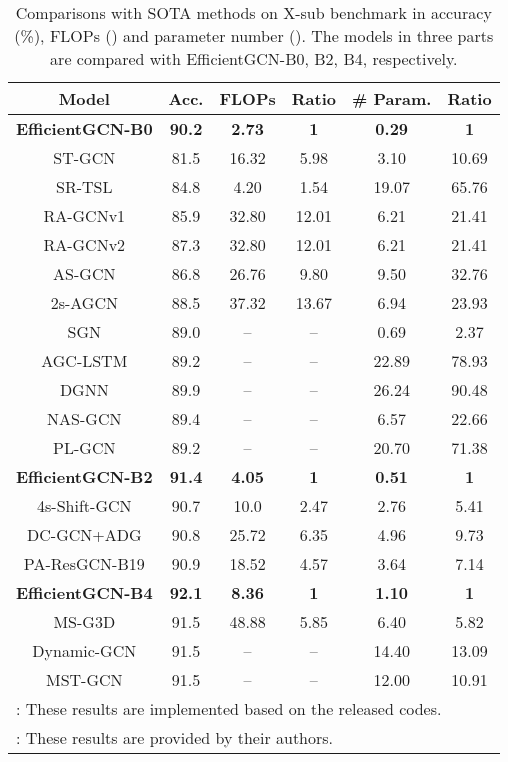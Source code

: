 \documentclass[10pt,journal,compsoc]{IEEEtran}
\begin{document}
\begin{table}[t]
  \caption{Comparisons with SOTA methods on X-sub benchmark in accuracy (\%), FLOPs () and parameter number (). The models in three parts are compared with EfficientGCN-B0, B2, B4, respectively.}
  \label{tab:complexity}
  \vspace{-0.4cm}
  \centering
  \setlength{\tabcolsep}{4pt}
  \renewcommand{\arraystretch}{1.2}
  \begin{tabular}{cc|cc|cc}
  \toprule
  Model & Acc. & FLOPs & Ratio & \# Param. & Ratio \\
  \midrule
  {\bf EfficientGCN-B0} & {\bf 90.2} & {\bf 2.73} & {\bf 1} & {\bf 0.29} & {\bf 1} \\
  ST-GCN \cite{yan2018spatial} & 81.5 & 16.32 & 5.98 & 3.10 & 10.69 \\
  SR-TSL \cite{si2018skeleton} & 84.8 & 4.20 & 1.54 & 19.07 & 65.76 \\
  RA-GCNv1 \cite{song2019richly} & 85.9 & 32.80 & 12.01 & 6.21 & 21.41 \\
  RA-GCNv2 \cite{song2020richly} & 87.3 & 32.80 & 12.01 & 6.21 & 21.41 \\
  AS-GCN \cite{li2019actional} & 86.8 & 26.76 & 9.80 & 9.50 & 32.76 \\
  2s-AGCN \cite{shi2019two} & 88.5 & 37.32 & 13.67 & 6.94 & 23.93 \\
  SGN \cite{zhang2020semantics} & 89.0 & -- & -- & 0.69 & 2.37 \\
  AGC-LSTM \cite{si2019attention} & 89.2 & -- & -- & 22.89 & 78.93 \\
  DGNN \cite{shi2019skeleton} & 89.9 & -- & -- & 26.24 & 90.48 \\
  NAS-GCN \cite{peng2020learning} & 89.4 & -- & -- & 6.57 & 22.66 \\
  PL-GCN \cite{huang2020part} & 89.2 & -- & -- & 20.70 & 71.38 \\
  \midrule
  {\bf EfficientGCN-B2} & {\bf 91.4} & {\bf 4.05} & {\bf 1} & {\bf 0.51} & {\bf 1} \\
  4s-Shift-GCN \cite{cheng2020skeleton} & 90.7 & 10.0 & 2.47 & 2.76 & 5.41 \\
  DC-GCN+ADG \cite{cheng2020decoupling} & 90.8 & 25.72 & 6.35 & 4.96 & 9.73 \\
  PA-ResGCN-B19 \cite{song2020stronger} & 90.9 & 18.52 & 4.57 & 3.64 & 7.14 \\
  \midrule
  {\bf EfficientGCN-B4} & {\bf 92.1} & {\bf 8.36} & {\bf 1} & {\bf 1.10} & {\bf 1} \\
  MS-G3D \cite{liu2020disentangling} & 91.5 & 48.88 & 5.85 & 6.40 & 5.82 \\
  Dynamic-GCN \cite{ye2020dynamic} & 91.5 & -- & -- & 14.40 & 13.09 \\
  MST-GCN \cite{chen2021multi} & 91.5 & -- & -- & 12.00 & 10.91 \\
  \bottomrule
  \multicolumn{6}{l}{: These results are implemented based on the released codes.}\\
  \multicolumn{6}{l}{: These results are provided by their authors.}\\
  \end{tabular}
\end{table}
\end{document}
